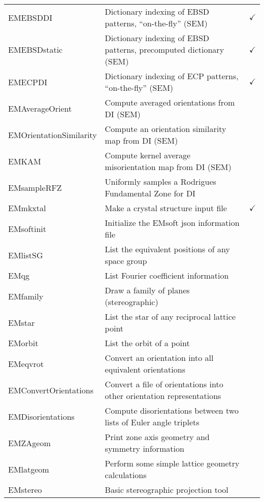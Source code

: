 \documentclass[DIV=calc, paper=letter, fontsize=11pt]{scrartcl}	 %
\begin{document}
\begin{table*}[h]
{\begin{tabular}{|l|l|c|}
    {\color{blue}\textsf{EMEBSDDI}} & Dictionary indexing of EBSD patterns, ``on-the-fly'' (SEM) & $\checkmark$\\
    {\color{blue}\textsf{EMEBSDstatic}} & Dictionary indexing of EBSD patterns, precomputed dictionary (SEM) &$\checkmark$ \\
    {\color{blue}\textsf{EMECPDI}} & Dictionary indexing of ECP patterns, ``on-the-fly'' (SEM) &$\checkmark$ \\
    {\color{blue}\textsf{EMAverageOrient}} & Compute averaged orientations from DI (SEM) & \\
    {\color{blue}\textsf{EMOrientationSimilarity}} & Compute an orientation similarity map from DI (SEM) & \\
    {\color{blue}\textsf{EMKAM}} & Compute kernel average misorientation map from DI (SEM) & \\
    {\color{blue}\textsf{EMsampleRFZ}} & Uniformly samples a Rodrigues Fundamental Zone for DI& \\
\hline
  \textsf{EMmkxtal} & Make a crystal structure input file& $\checkmark$\\
  {\color{blue}\textsf{EMsoftinit}} & Initialize the \textsf{EMsoft} json information file & \\
  \textsf{EMlistSG} & List the equivalent positions of any space group & \\
  \textsf{EMqg} & List Fourier coefficient information & \\
  \textsf{EMfamily} & Draw a family of planes (stereographic) & \\
  \textsf{EMstar} & List the star of any reciprocal lattice point & \\
  \textsf{EMorbit} & List the orbit of a point & \\
    {\color{blue}\textsf{EMeqvrot}} & Convert an orientation into all equivalent orientations & \\
    {\color{blue}\textsf{EMConvertOrientations}} & Convert a file of orientations into other orientation representations & \\
    {\color{blue}\textsf{EMDisorientations}} & Compute disorientations between two lists of Euler angle triplets & \\
  \textsf{EMZAgeom} & Print zone axis geometry and symmetry information & \\
  \textsf{EMlatgeom} & Perform some simple lattice geometry calculations & \\
  \textsf{EMstereo} & Basic stereographic projection tool & \\

\end{tabular}}
\end{table*}
\end{document}
